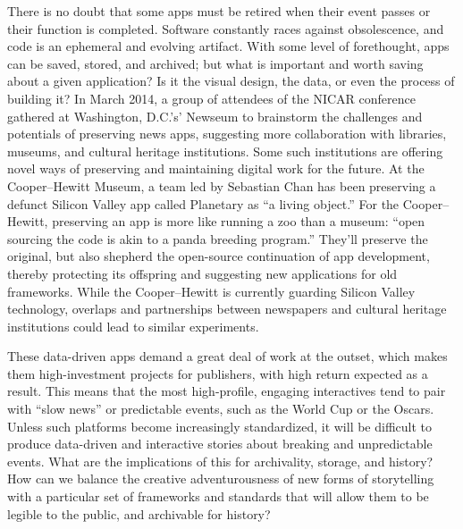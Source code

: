 There is no doubt that some apps must be retired when their event passes or their function is completed. Software constantly races against obsolescence, and code is an ephemeral and evolving artifact. With some level of forethought, apps can be saved, stored, and archived; but what is important and worth saving about a given application? Is it the visual design, the data, or even the process of building it? In March 2014, a group of attendees of the NICAR conference gathered at Washington, D.C.'s' Newseum to brainstorm the challenges and potentials of preserving news apps, suggesting more collaboration with libraries, museums, and cultural heritage institutions.\autocite{_opennews/hackdays/archive_????} Some such institutions are offering novel ways of preserving and maintaining digital work for the future. At the Cooper--Hewitt Museum, a team led by Sebastian Chan has been preserving a defunct Silicon Valley app called Planetary as ``a living object.'' For the Cooper--Hewitt, preserving an app is more like running a zoo than a museum: ``open sourcing the code is akin to a panda breeding program.''\autocite{chan_planetary:_2013} They'll preserve the original, but also shepherd the open-source continuation of app development, thereby protecting its offspring and suggesting new applications for old frameworks. While the Cooper--Hewitt is currently guarding Silicon Valley technology, overlaps and partnerships between newspapers and cultural heritage institutions could lead to similar experiments.

These data-driven apps demand a great deal of work at the outset, which makes them high-investment projects for publishers, with high return expected as a result. This means that the most high-profile, engaging interactives tend to pair with ``slow news'' or predictable events, such as the World Cup or the Oscars. Unless such platforms become increasingly standardized, it will be difficult to produce data-driven and interactive stories about breaking and unpredictable events. What are the implications of this for archivality, storage, and history? How can we balance the creative adventurousness of new forms of storytelling with a particular set of frameworks and standards that will allow them to be legible to the public, and archivable for history?

